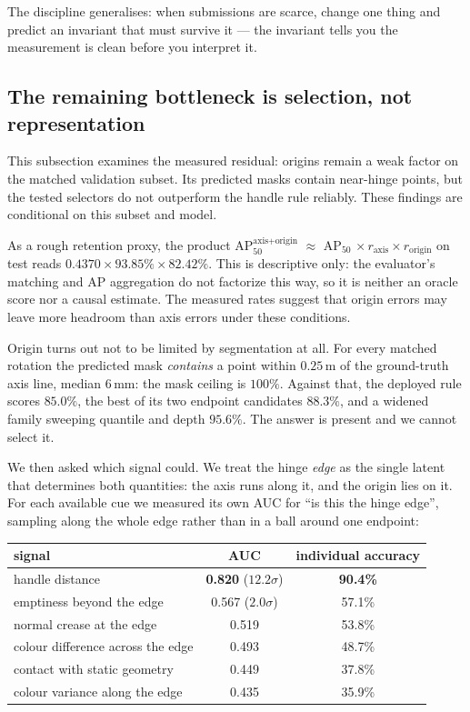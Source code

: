 \documentclass[11pt]{article}
\newcommand{\metric}{AP$_{50}^{\text{axis+origin}}$}
\newcommand{\apfifty}{AP$_{50}$}
\begin{document}
The discipline generalises: when submissions are scarce, change one thing
and predict an invariant that must survive it --- the invariant tells you
the measurement is clean before you interpret it.

\subsection{The remaining bottleneck is selection, not representation}
\label{sec:selection}

This subsection examines the measured residual: origins remain a weak
factor on the matched validation subset. Its predicted masks contain
near-hinge points, but the tested selectors do not outperform the handle
rule reliably. These findings are conditional on this subset and model.

As a rough retention proxy, the product
\metric{} $\approx$ \apfifty{} $\times\, r_{\text{axis}} \times r_{\text{origin}}$
on test reads $0.4370 \times 93.85\% \times 82.42\%$. This is descriptive
only: the evaluator's matching and AP aggregation do not factorize this way,
so it is neither an oracle score nor a causal estimate. The measured rates
suggest that origin errors may leave more headroom than axis errors under
these conditions.

Origin turns out not to be limited by segmentation at all. For every matched
rotation the predicted mask \emph{contains} a point within $0.25$\,m of the
ground-truth axis line, median $6$\,mm: the mask ceiling is $100\%$. Against
that, the deployed rule scores $85.0\%$, the best of its two endpoint
candidates $88.3\%$, and a widened family sweeping quantile and depth
$95.6\%$. The answer is present and we cannot select it.

We then asked which signal could. We treat the hinge \emph{edge} as the
single latent that determines both quantities: the axis runs along it, and
the origin lies on it. For each available cue we measured its own AUC for
``is this the hinge edge'', sampling along the whole edge rather than in a
ball around one endpoint:

\begin{center}
\small
\begin{tabular}{lcc}
\toprule
signal & AUC & individual accuracy \\
\midrule
handle distance & \textbf{0.820} ($12.2\sigma$) & \textbf{90.4\%} \\
emptiness beyond the edge & 0.567 ($2.0\sigma$) & 57.1\% \\
normal crease at the edge & 0.519 & 53.8\% \\
colour difference across the edge & 0.493 & 48.7\% \\
contact with static geometry & 0.449 & 37.8\% \\
colour variance along the edge & 0.435 & 35.9\% \\
\bottomrule
\end{tabular}
\end{center}
\end{document}
